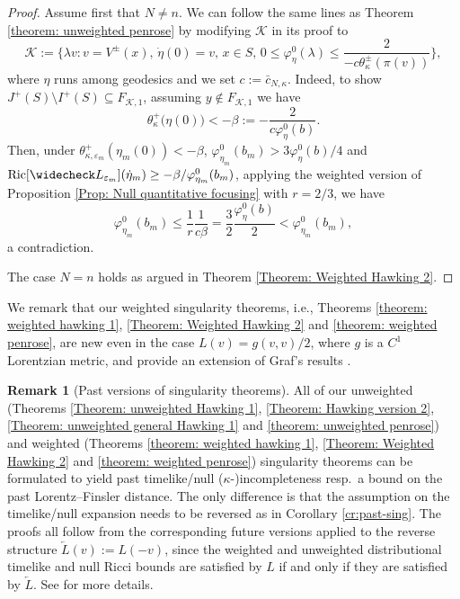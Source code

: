 \documentclass[a4paper,11pt]{article}
\numberwithin{equation}{section}
\theoremstyle{definition}
\newtheorem{Remark}[Definition]{Remark}
\theoremstyle{plain}
\newcommand{\eps}{\varepsilon}
\newcommand{\Ric}{\mathrm{Ric}}
\begin{document}
\begin{proof}
Assume first that $N\ne n$. 
We can follow the same lines as Theorem \ref{theorem: unweighted penrose} by modifying $\mathcal{K}$ in its proof to
\[
\mathcal{K} :=\biggl\{ \lambda v : v=V^\pm(x),\, \dot \eta(0) = v, \, x \in S,\, 0 \le \varphi^0_\eta(\lambda) \le \frac{2}{-c\theta_\kappa^\pm(\pi(v))} \biggr\},
\]
where $\eta$ runs among geodesics and we set $c:=\bar{c}_{N,\kappa}$.
Indeed, to show $J^+(S) \setminus I^+(S) \subseteq F_{\mathcal{K},1}$, assuming $y \not\in F_{\mathcal{K},1}$ we have
\[
\theta^+_\kappa \bigl(\eta(0)\bigr)
<-\beta :=-\frac{2}{c\varphi^0_\eta(b)}.
\]
Then, under $\theta^+_{\kappa,\eps_m}(\eta_m(0))<-\beta$, $\varphi^0_{\eta_m}(b_m) >3\varphi^0_\eta(b)/4$ and $\Ric[\widecheck L_{\eps_m}](\dot{\eta}_m) \ge -\beta/\varphi^0_{\eta_m}(b_m)$, applying the weighted version of Proposition \ref{Prop: Null quantitative focusing} with $r=2/3$, we have
\[
\varphi^0_{\eta_m}(b_m) \le \frac{1}{r} \frac{1}{c\beta} =\frac{3}{2} \frac{\varphi^0_\eta(b)}{2} <\varphi^0_{\eta_m}(b_m), \]
a contradiction.

The case $N = n$ holds as argued in Theorem \ref{Theorem: Weighted Hawking 2}.
\end{proof}

We remark that our weighted singularity theorems, i.e., Theorems \ref{theorem: weighted hawking 1}, \ref{Theorem: Weighted Hawking 2} and \ref{theorem: weighted penrose}, are new even in the case $L(v) = g(v,v)/2$, where $g$ is a $C^1$ Lorentzian metric, and provide an extension of Graf's results \cite{Graf-SingularityC1}.

\begin{Remark}[Past versions of singularity theorems]
\label{remark: past versions of singularity theorems}
All of our unweighted (Theorems \ref{Theorem: unweighted Hawking 1}, \ref{Theorem: Hawking version 2}, \ref{Theorem: unweighted general Hawking 1} and \ref{theorem: unweighted penrose}) and weighted (Theorems \ref{theorem: weighted hawking 1}, \ref{Theorem: Weighted Hawking 2} and \ref{theorem: weighted penrose}) singularity theorems can be formulated to yield past timelike/null ($\kappa$-)incompleteness resp.\ a bound on the past Lorentz--Finsler distance.
The only difference is that the assumption on the timelike/null expansion needs to be reversed as in Corollary \ref{cr:past-sing}. 
The proofs all follow from the corresponding future versions applied to the reverse structure $\overleftarrow{L}(v):=L(-v)$, since the weighted and unweighted distributional timelike and null Ricci bounds are satisfied by $L$ if and only if they are satisfied by $\overleftarrow{L}$.
See \cite[Rem.\ 8.14]{LuMinguzziOhtaSingularity} for more details.
\end{Remark}
\end{document}
